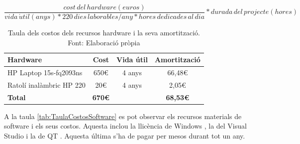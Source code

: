 \documentclass[a4paper]{article}
\begin{document}
\[
\frac{cost\, del\, hardware (euros)}{vida\, \acute{u}til (anys) * 220\, dies\, laborables/any * hores\, dedicades\, al\, dia} * durada\, del\, projecte (hores)
\]

\begin{table}[H]
    \begin{center}
        \begin{tabular}{|l|c|c|c|}
            \hline
            \rowcolor[HTML]{9B9B9B} 
            {\color[HTML]{000000} \textbf{Hardware}} & {\color[HTML]{000000} \textbf{Cost}} & {\color[HTML]{000000} \textbf{Vida útil}} & {\color[HTML]{000000} \textbf{Amortització}} \\ \hline
            HP Laptop 15s-fq2093ns                   & 650€                                 & 4 anys                                    & 66,48€                                       \\ \hline
            Ratolí inalàmbric HP 220                 & 20€                                  & 4 anys                                    & 2,05€                                        \\ \hline
            \rowcolor[HTML]{C0C0C0} 
            {\color[HTML]{000000} \textbf{Total}}    & {\color[HTML]{000000} \textbf{670€}}     & {\color[HTML]{000000} \textbf{}}          & {\color[HTML]{000000} \textbf{68,53€}}       \\ \hline
        \end{tabular}
        \caption[Taula dels costos dels recursos hardware i la seva amortització]{Taula dels costos dels recursos hardware i la seva amortització. Font: Elaboració pròpia}
        \label{tab:TaulaCostosHardware}
    \end{center}
\end{table}

A la taula \ref{tab:TaulaCostosSoftware} es pot observar els recursos materials de software i els seus costos. Aquesta inclou la llicència de Windows \cite{Windows}, la del Visual Studio \cite{VisualStudio} i la de QT \cite{Qt}. Aquesta última s'ha de pagar per mesos durant tot un any.
\end{document}

